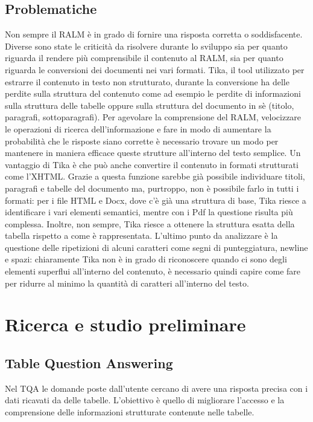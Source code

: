 \subsection{Problematiche}
Non sempre il RALM è in grado di fornire una risposta corretta o soddisfacente.
Diverse sono state le criticità da risolvere durante lo sviluppo sia per quanto riguarda il rendere più comprensibile il contenuto al RALM, sia per quanto riguarda le conversioni dei documenti nei vari formati.
Tika, il tool utilizzato per estrarre il contenuto in testo non strutturato, durante la conversione ha delle perdite sulla struttura del contenuto come ad esempio le perdite di informazioni sulla struttura delle tabelle oppure sulla struttura del documento in sè (titolo, paragrafi, sottoparagrafi).
Per agevolare la comprensione del RALM, velocizzare le operazioni di ricerca dell'informazione e fare in modo di aumentare la probabilità che le risposte siano corrette è necessario trovare un modo per mantenere in maniera efficace queste strutture all'interno del testo semplice.
Un vantaggio di Tika è che può anche convertire il contenuto in formati strutturati come l'XHTML.
Grazie a questa funzione sarebbe già possibile individuare titoli, paragrafi e tabelle del documento ma, purtroppo, non è possibile farlo in tutti i formati: per i file HTML e Docx, dove c'è già una struttura di base, Tika riesce a identificare i vari elementi semantici, mentre con i Pdf la questione risulta più complessa.
Inoltre, non sempre, Tika riesce a ottenere la struttura esatta della tabella rispetto a come è rappresentata.
L'ultimo punto da analizzare è la questione delle ripetizioni di alcuni caratteri come segni di punteggiatura, newline e spazi: chiaramente Tika non è in grado di riconoscere quando ci sono degli elementi superflui all'interno del contenuto, è necessario quindi capire come fare per ridurre al minimo la quantità di caratteri all'interno del testo. 


\section{Ricerca e studio preliminare}
\subsection{Table Question Answering}
Nel \gls{TQA} le domande poste dall'utente cercano di avere una risposta precisa con i dati ricavati da delle tabelle.
L'obiettivo è quello di migliorare l'accesso e la comprensione delle informazioni strutturate contenute nelle tabelle.


